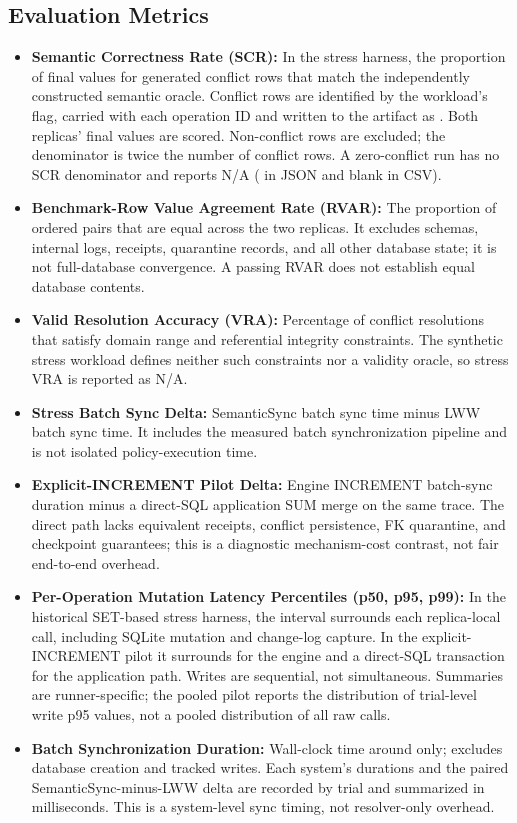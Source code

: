 \documentclass[runningheads]{llncs}
\begin{document}
\subsection{Evaluation Metrics}
\begin{itemize}
\item \textbf{Semantic Correctness Rate (SCR):} In the stress harness, the proportion of final values for generated conflict rows that match the independently constructed semantic oracle. Conflict rows are identified by the workload's \texttt{} flag, carried with each operation ID and written to the artifact as \texttt{}. Both replicas' final values are scored. Non-conflict rows are excluded; the denominator is twice the number of conflict rows. A zero-conflict run has no SCR denominator and reports N/A (\texttt{} in JSON and blank in CSV).
\item \textbf{Benchmark-Row Value Agreement Rate (RVAR):} The proportion of ordered \texttt{} pairs that are equal across the two replicas. It excludes schemas, internal logs, receipts, quarantine records, and all other database state; it is not full-database convergence. A passing RVAR does not establish equal database contents.
\item \textbf{Valid Resolution Accuracy (VRA):} Percentage of conflict resolutions that satisfy domain range and referential integrity constraints. The synthetic stress workload defines neither such constraints nor a validity oracle, so stress VRA is reported as N/A.
\item \textbf{Stress Batch Sync Delta:} SemanticSync batch sync time minus LWW batch sync time. It includes the measured batch synchronization pipeline and is not isolated policy-execution time.
\item \textbf{Explicit-INCREMENT Pilot Delta:} Engine INCREMENT batch-sync duration minus a direct-SQL application SUM merge on the same trace. The direct path lacks equivalent receipts, conflict persistence, FK quarantine, and checkpoint guarantees; this is a diagnostic mechanism-cost contrast, not fair end-to-end overhead.
\item \textbf{Per-Operation Mutation Latency Percentiles (p50, p95, p99):} In the historical SET-based stress harness, the interval surrounds each replica-local \texttt{} call, including SQLite mutation and change-log capture. In the explicit-INCREMENT pilot it surrounds \texttt{} for the engine and a direct-SQL transaction for the application path. Writes are sequential, not simultaneous. Summaries are runner-specific; the pooled pilot reports the distribution of trial-level write p95 values, not a pooled distribution of all raw calls.
\item \textbf{Batch Synchronization Duration:} Wall-clock time around \texttt{} only; excludes database creation and tracked writes. Each system's durations and the paired SemanticSync-minus-LWW delta are recorded by trial and summarized in milliseconds. This is a system-level sync timing, not resolver-only overhead.
\end{itemize}
\end{document}
